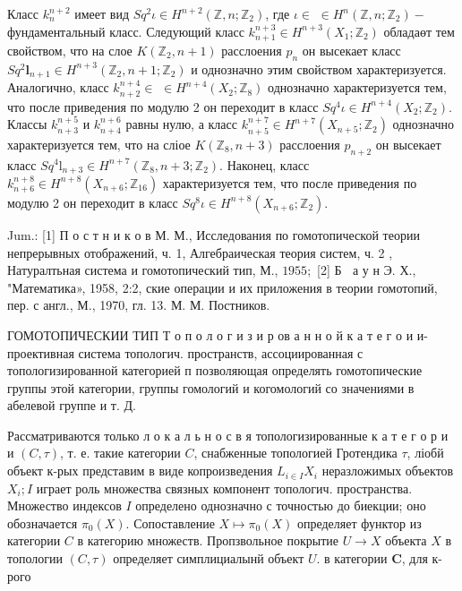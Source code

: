 \documentclass[10pt]{article}
\begin{document}
Класс $k_{n}^{n+2}$ имеет вид $S q^{2} \iota \in H^{n+2}\left(\mathbb{Z}, n ; \mathbb{Z}_{2}\right)$, где $\iota \in$ $\in H^{n}\left(\mathbb{Z}, n ; \mathbb{Z}_{2}\right)-$ фундаментальный класс. Следующий класс $k_{n+1}^{n+3} \in H^{n+3}\left(X_{1} ; \mathbb{Z}_{2}\right)$ обладаөт тем свойством, что на слое $K\left(\mathbb{Z}_{2}, n+1\right)$ расслоения $p_{n}$ он высекает класс $S q^{2} \mathbf{l}_{n+1} \in H^{n+3}\left(\mathbb{Z}_{2}, n+1 ; \mathbb{Z}_{2}\right)$ и однозначно этим свойством характеризуется. Аналогично, класс $k_{n+2}^{n+4} \in$ $\in H^{n+4}\left(X_{2} ; \mathbb{Z}_{8}\right)$ однозначно характеризуется тем, что после приведения по модулю 2 он переходит в класс $S q^{4} \iota \in H^{n+4}\left(X_{2} ; \mathbb{Z}_{2}\right)$. Классы $k_{n+3}^{n+5}$ и $k_{n+4}^{n+6}$ равны нулю, а класс $k_{n+5}^{n+7} \in H^{n+7}\left(X_{n+5} ; \mathbb{Z}_{2}\right)$ однозначно характеризуется тем, что на сліое $K\left(\mathbb{Z}_{8}, n+3\right)$ расслоения $p_{n+2}$ он высекает класс $S q^{4} \mathrm{l}_{n+3} \in H^{n+7}\left(\mathbb{Z}_{8}, n+3 ; \mathbb{Z}_{2}\right)$. Наконец, класс $k_{n+6}^{n+8} \in H^{n+8}\left(X_{n+6} ; \mathbb{Z}_{16}\right)$ характеризуется тем, что после приведения по модулю 2 он переходит в класс $S q^{8} \iota \in H^{n+8}\left(X_{n+6} ; \mathbb{Z}_{2}\right)$.



Jum.: [1] П о с т н и к о в М. М., Исследования по гомотопической теории непрерывных отображений, ч. 1, Алгебраическая теория систем, ч. 2 , Натуралтьная система и гомотопический тип, М., $1955 ;$ [2] Б $\mathbf{~}$ а у н Э. Х., "Математика», 1958, 2:2, ские операции и их приложения в теории гомотопий, пер. с англ., М., 1970, гл. 13. М. М. Постников.



ГОМОТОПИЧЕСКИИ ТИП Т о п о л о г и з и р ов а н н о й к а т е г о и и-проективная система топологич. пространств, ассоциированная с топологизированной категорией п позволяющая определять гомотопические группы этой категории, группы гомологий и когомологий со значениями в абелевой группе и т. Д.



Рассматриваются только л о к а л ь н о с в я топологизированные к а т е г о р и и $(C, \tau)$, т. е. такие категории $C$, снабженные топологией Гротендика $\tau$, ліобй объект к-рых представим в виде копроизведения $L_{i \in I} X_{i}$ неразложимых объектов $X_{i} ; I$ играет роль множества связных компонент топологич. пространства. Множество индексов $I$ определено однозначно с точностью до биекции; оно обозначается $\pi_{0}(X)$. Сопоставление $X \mapsto \pi_{0}(X)$ определяет функтор из категории $C$ в категорию множеств. Пропзвольное покрытие $U \rightarrow X$ объекта $X$ в топологии $(C, \tau)$ определяет симплициалынй объект $U$. в категории $\boldsymbol{C}$, для к-рого
\end{document}
